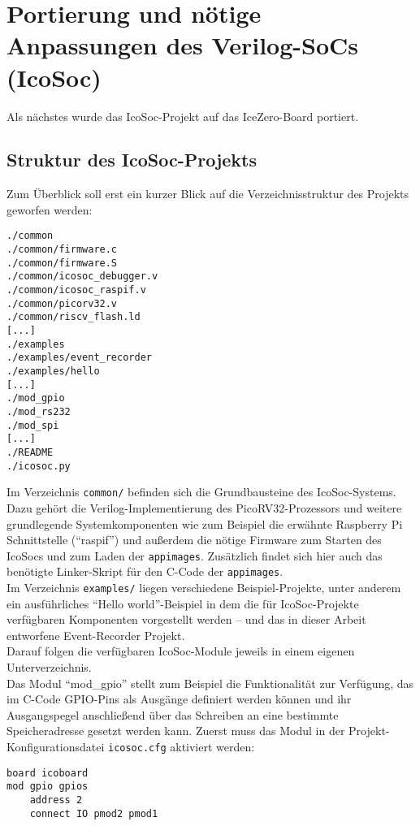 {\section{Portierung und nötige Anpassungen des Verilog-SoCs (IcoSoc)}
\label{ch:Implementierung:sec:icosoc}
Als nächstes wurde das IcoSoc-Projekt auf das IceZero-Board portiert. 

\subsection{Struktur des IcoSoc-Projekts}
Zum Überblick soll erst ein kurzer Blick auf die Verzeichnisstruktur des Projekts geworfen werden:
\begin{verbatim}
./common
./common/firmware.c
./common/firmware.S
./common/icosoc_debugger.v
./common/icosoc_raspif.v
./common/picorv32.v
./common/riscv_flash.ld
[...]
./examples
./examples/event_recorder
./examples/hello
[...]
./mod_gpio
./mod_rs232
./mod_spi
[...]
./README
./icosoc.py
\end{verbatim}

Im Verzeichnis {\tt common/} befinden sich die Grundbausteine des IcoSoc-Systems. Dazu gehört die Verilog-Implementierung des PicoRV32-Prozessors und weitere grundlegende Systemkomponenten wie zum Beispiel die erwähnte Raspberry Pi Schnittstelle (``raspif'') und außerdem die nötige Firmware zum Starten des IcoSocs und zum Laden der {\tt appimages}. Zusätzlich findet sich hier auch das benötigte Linker-Skript für den C-Code der {\tt appimages}.\\
Im Verzeichnis {\tt examples/} liegen verschiedene Beispiel-Projekte, unter anderem ein ausführliches ``Hello world''-Beispiel in dem die für IcoSoc-Projekte verfügbaren Komponenten vorgestellt werden -- und das in dieser Arbeit entworfene Event-Recorder Projekt.\\
Darauf folgen die verfügbaren IcoSoc-Module jeweils in einem eigenen Unterverzeichnis.\\
Das Modul ``mod\_gpio'' stellt zum Beispiel die Funktionalität zur Verfügung, das im C-Code GPIO-Pins als Ausgänge definiert werden können und ihr Ausgangspegel anschließend über das Schreiben an eine bestimmte Speicheradresse gesetzt werden kann. 
Zuerst muss das Modul in der Projekt-Konfigurationsdatei {\tt icosoc.cfg} aktiviert werden:
\begin{verbatim}
board icoboard
mod gpio gpios
    address 2
    connect IO pmod2 pmod1
\end{verbatim}

}
